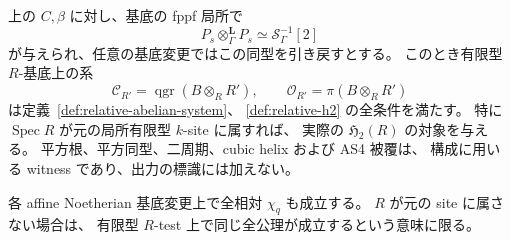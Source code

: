 \begin{theorem}
\label{thm:geometric-cubic-relative-effectivity}
上の $C,\beta$ に対し、基底の fppf 局所で
\[
 P_s\otimes_\Gamma^{\mathbf L}P_s
       \simeq\mathcal S_\Gamma^{-1}[2]
 \tag{GC-root}\label{eq:general-cubic-serre-input}
\]
が与えられ、任意の基底変更ではこの同型を引き戻すとする。
このとき有限型 $R$-基底上の系
\[
 \mathcal C_{R'}=\operatorname{qgr}(B\otimes_RR'),\qquad
 \mathcal O_{R'}=\pi(B\otimes_RR')
 \tag{GC-family}\label{eq:general-cubic-relative-family}
\]
は定義~\ref{def:relative-abelian-system}、
\ref{def:relative-h2} の全条件を満たす。
特に $\operatorname{Spec}R$ が元の局所有限型 $k$-site に属すれば、
実際の $\mathfrak H_2(R)$ の対象を与える。
平方根、平方同型、二周期、cubic helix および AS4 被覆は、
構成に用いる witness であり、出力の標識には加えない。

各 affine Noetherian 基底変更上で全相対 $\chi_q$ も成立する。
$R$ が元の site に属さない場合は、
有限型 $R$-test 上で同じ全公理が成立するという意味に限る。
\end{theorem}

